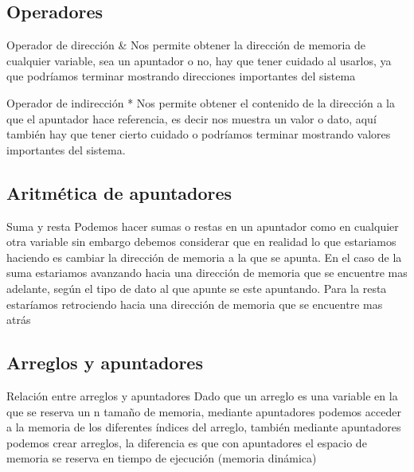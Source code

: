 \documentclass{beamer}
\begin{document}
\subsection{Operadores}
\begin{frame}{Operador de direcci\'on \&}
	Nos permite obtener la direcci\'on de memoria de cualquier variable, sea un apuntador o no, hay que tener cuidado al usarlos, ya que podr\'iamos terminar mostrando direcciones importantes del sistema
\end{frame}

\begin{frame}{Operador de indirecci\'on *}
	Nos permite obtener el contenido de la direcci\'on a la que el apuntador hace referencia, es decir nos muestra un valor o dato, aqu\'i tambi\'en hay que tener cierto cuidado o podr\'iamos terminar mostrando valores importantes del sistema.
\end{frame}

\subsection{Aritm\'etica de apuntadores}

\begin{frame}{Suma y resta}
	Podemos hacer sumas o restas en un apuntador como en cualquier otra variable sin embargo debemos considerar que en realidad lo que estariamos haciendo es cambiar la direcci\'on de memoria a la que se apunta.
	En el caso de la suma estariamos avanzando hacia una direcci\'on de memoria que se encuentre mas adelante, seg\'un el tipo de dato al que apunte se este apuntando.
	Para la resta estar\'iamos retrociendo hacia una direcci\'on de memoria que se encuentre mas atr\'as
\end{frame}

\subsection{Arreglos y apuntadores}

\begin{frame}{Relaci\'on entre arreglos y apuntadores}
	Dado que un arreglo es una variable en la que se reserva un n tamaño de memoria, mediante apuntadores podemos acceder a la memoria de los diferentes \'indices del arreglo, tambi\'en mediante apuntadores podemos crear arreglos, la diferencia es que con apuntadores el espacio de memoria se reserva en tiempo de ejecuci\'on (memoria din\'amica)
\end{frame}
\end{document}
